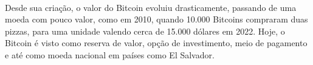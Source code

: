 \documentclass[letterpaper,11pt,leqno]{article}
\begin{document}
\paragraph{}
Desde sua criação, o valor do Bitcoin evoluiu drasticamente, passando de uma
moeda com pouco valor, como em 2010, quando 10.000 Bitcoins compraram duas
pizzas, para uma unidade valendo cerca de 15.000 dólares em 2022. Hoje, o
Bitcoin é visto como reserva de valor, opção de investimento, meio de pagamento
e até como moeda nacional em países como El Salvador.

% 
\end{document}
